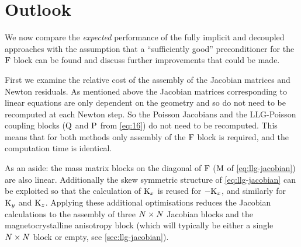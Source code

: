 






\section{Outlook}
\label{sec:furth-optim-opport}

We now compare the \emph{expected} performance of the fully implicit and decoupled approaches with the assumption that a ``sufficiently good'' preconditioner for the $\mathrm{F}$ block can be found and discuss further improvements that could be made.

First we examine the relative cost of the assembly of the Jacobian matrices and Newton residuals.
As mentioned above the Jacobian matrices corresponding to linear equations are only dependent  on the geometry and so do not need to be recomputed at each Newton step.
So the Poisson Jacobians and the LLG-Poisson coupling blocks ($\mathrm{Q}$ and $\mathrm{P}$ from \cref{eq:16}) do not need to be recomputed.
This means that for both methods only assembly of the $\mathrm{F}$ block is required, and the computation time is identical.

As an aside: the mass matrix blocks on the diagonal of $\mathrm{F}$ ($\mathrm{M}$ of \cref{eq:llg-jacobian}) are also linear.
Additionally the skew symmetric structure of \cref{eq:llg-jacobian} can be exploited so that the calculation of $\mathrm{K}_x$ is reused for $-\mathrm{K}_x$, and similarly for $\mathrm{K}_y$ and $\mathrm{K}_z$.
Applying these additional optimisations reduces the Jacobian calculations to the assembly of three $N \times N$ Jacobian blocks and the magnetocrystalline anisotropy block (which will typically be either a single $N \times N$ block or empty, see \cref{sec:llg-jacobian}).

